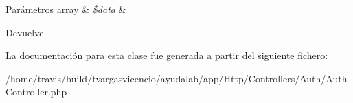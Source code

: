 \begin{DoxyParams}[1]{\-Parámetros}
array & {\em \$data} & \\
\hline
\end{DoxyParams}
\begin{DoxyReturn}{\-Devuelve}

\end{DoxyReturn}


\-La documentación para esta clase fue generada a partir del siguiente fichero\-:\begin{DoxyCompactItemize}
\item 
/home/travis/build/tvargasvicencio/ayudalab/app/\-Http/\-Controllers/\-Auth/\-Auth\-Controller.\-php\end{DoxyCompactItemize}
